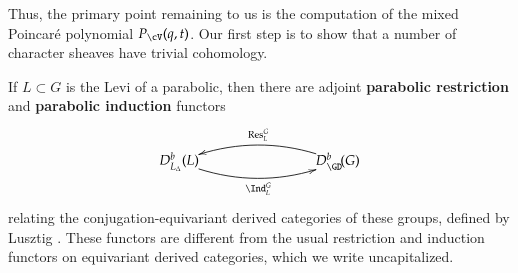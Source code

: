 \documentclass[12pt]{amsart}
\DeclareMathOperator{\Res}{Res}
\newtheorem{prop}[thm]{Proposition}
\theoremstyle{remark}
\begin{document}


Thus,
the primary point remaining to us is the computation of the mixed
Poincar\'e polynomial $P_\cV(q,t)$.  Our first step is to show that a
number of character sheaves have trivial cohomology.

If $L\subset G$ is the Levi of a parabolic, then there are adjoint
{\bf parabolic restriction} and {\bf parabolic induction} functors
\begin{equation*}
  \xy
(0,0)*{D^b_{L_\Delta}(L)}="A";
(40,0)*{D^b_{\GD}\!(G)}="B";
{\ar@/_12pt/_{\Ind^G_L} "A";"B"};
{\ar@/_12pt/_{\Res^G_L} "B";"A"};
\endxy
\end{equation*}
relating the conjugation-equivariant derived categories of these groups, defined by Lusztig \cite{LusCSI}.  These functors are different from the usual restriction and induction functors on equivariant derived categories, which we write uncapitalized.
\end{document}
